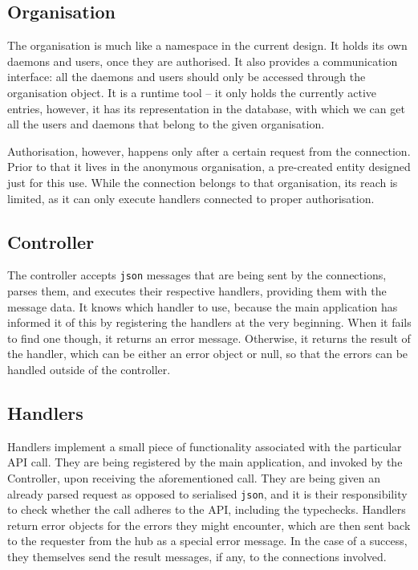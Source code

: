 \documentclass{l3proj}
\begin{document}
\subsection{Organisation}

The organisation is much like a namespace in the current design. It holds its own daemons and users, once they are authorised. It also provides a communication interface: all the daemons and users should only be accessed through the organisation object. It is a runtime tool – it only holds the currently active entries, however, it has its representation in the database, with which we can get all the users and daemons that belong to the given organisation. 

Authorisation, however, happens only after a certain request from the connection. Prior to that it lives in the anonymous organisation, a pre-created entity designed just for this use. While the connection belongs to that organisation, its reach is limited, as it can only execute handlers connected to proper authorisation.

\subsection{Controller}

The controller accepts \texttt{json} messages that are being sent by the connections, parses them, and executes their respective handlers, providing them with the message data. It knows which handler to use, because the main application has informed it of this by registering the handlers at the very beginning. When it fails to find one though, it returns an error message. Otherwise, it returns the result of the handler, which can be either an error object or null, so that the errors can be handled outside of the controller.

\subsection{Handlers}

Handlers implement a small piece of functionality associated with the particular API call. They are being registered by the main application, and invoked by the Controller, upon receiving the aforementioned call. They are being given an already parsed request as opposed to serialised \texttt{json}, and it is their responsibility to check whether the call adheres to the API, including the typechecks. Handlers return error objects for the errors they might encounter, which are then sent back to the requester from the hub as a special error message. In the case of a success, they themselves send the result messages, if any, to the connections involved.
\end{document}

